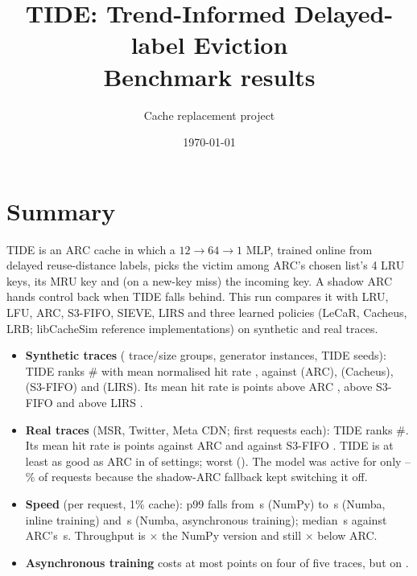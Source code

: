 \documentclass[10pt,a4paper]{article}
\title{TIDE: Trend-Informed Delayed-label Eviction\\\large Benchmark results}
\author{Cache replacement project}
\date{\today}
\begin{document}
\maketitle

\section*{Summary}
TIDE is an ARC cache in which a $12\to64\to1$ MLP, trained online from delayed reuse-distance labels, picks the victim
among ARC's chosen list's 4 LRU keys, its MRU key and (on a new-key miss) the incoming key. A shadow ARC hands control
back when TIDE falls behind. This run compares it with LRU, LFU, ARC, S3-FIFO, SIEVE, LIRS and three learned policies
(LeCaR, Cacheus, LRB; libCacheSim reference implementations) on synthetic and real traces.

\begin{itemize}
  \item \textbf{Synthetic traces} (\NGroupsSynth{} trace/size groups, \Instances{} generator instances, \Seeds{} TIDE seeds):
        TIDE ranks \#\RankSynthTIDE{} with mean normalised hit rate \NormSynthTIDE{}, against \NormSynthARC{} (ARC),
        \NormSynthCacheus{} (Cacheus), \NormSynthSthreeFIFO{} (S3-FIFO) and \NormSynthLIRS{} (LIRS).
        Its mean hit rate is \DSynthARC{} points above ARC \DSynthARCCI, \DSynthSthree{} above S3-FIFO \DSynthSthreeCI{}
        and \DSynthLIRS{} above LIRS \DSynthLIRSCI.
  \item \textbf{Real traces} (MSR, Twitter, Meta CDN; first \RealN{} requests each): TIDE ranks \#\RankRealTIDE.
        Its mean hit rate is \DRealARC{} points against ARC \DRealARCCI{} and \DRealSthree{} against S3-FIFO \DRealSthreeCI.
        TIDE is at least as good as ARC in \GeARCReal{} of \NGroupsReal{} settings; worst \WorstReal{} (\WorstCellReal).
        The model was active for only \ActiveRealMin--\ActiveRealMax\% of requests because the shadow-ARC fallback kept switching it off.
  \item \textbf{Speed} (per request, 1\% cache): p99 falls from \PNineNineRef\,\textmu s (NumPy) to \PNineNineSync\,\textmu s (Numba, inline training)
        and \PNineNineAsync\,\textmu s (Numba, asynchronous training); median \PFiftyAsync\,\textmu s against ARC's \PFiftyARC\,\textmu s.
        Throughput is \SpeedupAsync$\times$ the NumPy version and still \SlowdownAsync$\times$ below ARC.
  \item \textbf{Asynchronous training} costs at most \AsyncOthers{} points on four of five traces, but \AsyncWorst{} on \AsyncWorstTrace.
\end{itemize}
\end{document}
